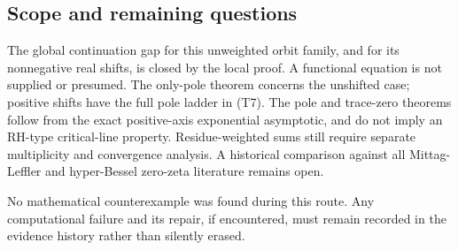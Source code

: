 \hypertarget{scope-and-remaining-questions}{%
\subsection{Scope and remaining
questions}\label{scope-and-remaining-questions}}

The global continuation gap for this unweighted orbit family, and for
its nonnegative real shifts, is closed by the local proof. A functional
equation is not supplied or presumed. The only-pole theorem concerns the
unshifted case; positive shifts have the full pole ladder in (T7). The
pole and trace-zero theorems follow from the exact positive-axis
exponential asymptotic, and do not imply an RH-type critical-line
property. Residue-weighted sums still require separate multiplicity and
convergence analysis. A historical comparison against all Mittag-Leffler
and hyper-Bessel zero-zeta literature remains open.

No mathematical counterexample was found during this route. Any
computational failure and its repair, if encountered, must remain
recorded in the evidence history rather than silently erased.
